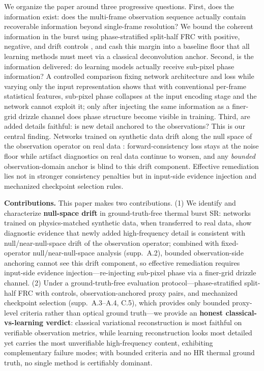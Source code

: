 We organize the paper around three progressive questions. First, does the
information exist: does the multi-frame observation sequence actually contain
recoverable information beyond single-frame resolution? We bound the coherent
information in the burst using phase-stratified split-half FRC with positive,
negative, and drift controls \citep{vanheel2005fourier}, and cash this margin into
a baseline floor that all learning methods must meet via a classical deconvolution
anchor. Second, is the information delivered: do learning models actually receive
sub-pixel phase information? A controlled comparison fixing network architecture
and loss while varying only the input representation shows that with conventional
per-frame statistical features, sub-pixel phase collapses at the input encoding
stage and the network cannot exploit it; only after injecting the same information
as a finer-grid drizzle channel does phase structure become visible in training.
Third, are added details faithful: is new detail anchored to the observations?
This is our central finding. Networks trained on synthetic data drift along the
null space of the observation operator on real data
\citep{schwab2019deep,chen2021equivariant}: forward-consistency loss stays at the
noise floor while artifact diagnostics on real data continue to worsen, and any
\emph{bounded} observation-domain anchor is blind to this drift component.
Effective remediation lies not in stronger consistency penalties but in
input-side evidence injection and mechanized checkpoint selection rules.

\textbf{Contributions.} This paper makes two contributions. (1) We identify and
characterize \textbf{null-space drift} in ground-truth-free thermal burst SR:
networks trained on physics-matched synthetic data, when transferred to real
data, show diagnostic evidence that newly added high-frequency detail is consistent
with null/near-null-space drift of the observation operator; combined with
fixed-operator null/near-null-space analysis (supp.\ A.2), bounded
observation-side anchoring cannot see this drift component, so effective remediation
requires input-side evidence injection---re-injecting sub-pixel phase via a
finer-grid drizzle channel. (2) Under a ground-truth-free evaluation protocol---phase-stratified split-half FRC with controls, observation-anchored proxy pairs, and mechanized checkpoint selection (supp.\ A.3--A.4, C.5), which provides only bounded proxy-level criteria rather than optical ground truth---we provide an \textbf{honest classical-vs-learning verdict}: classical variational reconstruction is most faithful on verifiable observation metrics, while learning reconstruction looks most detailed yet carries the most unverifiable high-frequency content, exhibiting complementary failure modes; with bounded criteria and no HR thermal ground truth, no single method is certifiably dominant.

